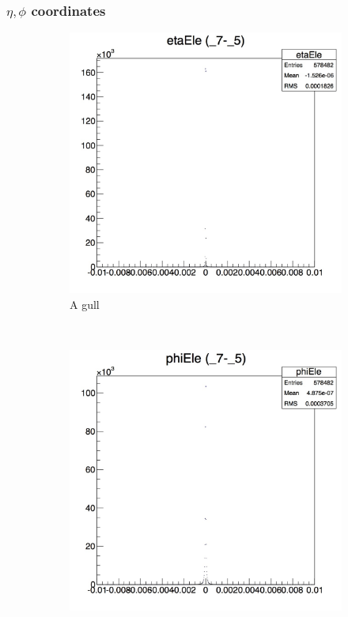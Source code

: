 \documentclass[10pt]{article}
\begin{document}
\subsubsection{$\eta,\phi$ coordinates}
\begin{figure}[h!]
        \centering
        \begin{subfigure}[b]{0.22\textwidth}
                \includegraphics[width=\textwidth]{Plots/eta}
                \caption{A gull}
                \label{fig:gull}
        \end{subfigure}%
        ~ %
        \begin{subfigure}[b]{0.22\textwidth}
                \includegraphics[width=\textwidth]{Plots/phi}

\end{subfigure}
\end{figure}
\end{document}
